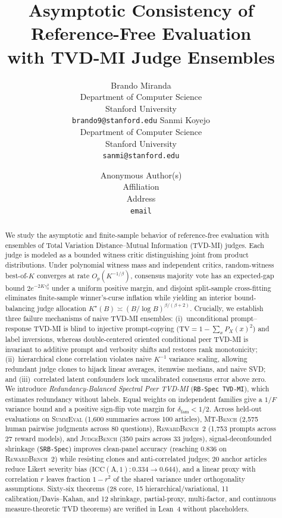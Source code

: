\documentclass{article}
\title{Asymptotic Consistency of Reference-Free Evaluation\\
with TVD-MI Judge Ensembles}
\author{%
  Brando Miranda \\
  Department of Computer Science \\
  Stanford University \\
  \texttt{brando9@stanford.edu}
  \And
  Sanmi Koyejo \\
  Department of Computer Science \\
  Stanford University \\
  \texttt{sanmi@stanford.edu}
}
\author{%
  Anonymous Author(s) \\
  Affiliation \\
  Address \\
  \texttt{email}
}
\theoremstyle{plain}
\theoremstyle{definition}
\theoremstyle{remark}
\begin{document}
\maketitle

\begin{abstract}
We study the asymptotic and finite-sample behavior of reference-free evaluation
with ensembles of Total Variation Distance--Mutual Information (TVD-MI) judges.
Each judge is modeled as a bounded witness critic distinguishing joint from
product distributions. Under polynomial witness mass and independent critics, random-witness best-of-$K$
converges at rate $O_p(K^{-1/\beta})$, consensus majority vote has
an expected-gap bound $2e^{-2K\gamma_0^2}$ under a uniform positive margin, and disjoint split-sample cross-fitting eliminates
finite-sample winner's-curse inflation while yielding an interior
bound-balancing judge allocation $K^\star(B) \asymp (B/\log B)^{\beta/(\beta+2)}$.
Crucially, we establish three failure mechanisms of naive TVD-MI ensembles:
(i)~unconditional prompt--response TVD-MI is blind to injective prompt-copying
($\mathrm{TV} = 1 - \sum_x P_X(x)^2$) and label inversions, whereas
double-centered oriented conditional peer TVD-MI is invariant to additive
prompt and verbosity shifts and restores rank monotonicity; (ii)~hierarchical
clone correlation violates naive $K^{-1}$ variance scaling, allowing redundant
judge clones to hijack linear averages, itemwise medians, and naive SVD; and
(iii)~correlated latent confounders lock uncalibrated consensus error above zero.
We introduce \emph{Redundancy-Balanced Spectral Peer TVD-MI} (\texttt{RB-Spec TVD-MI}),
which estimates redundancy without labels. Equal weights on independent families give
a $1/F$ variance bound and a positive sign-flip vote margin for
$\delta_{\mathrm{fam}} < 1/2$. Across held-out evaluations on \textsc{SummEval}
(1,600 summaries across 100 articles), \textsc{MT-Bench} (2,575 human
pairwise judgments across 80 questions), \textsc{RewardBench~2} (1,753
prompts across 27 reward models), and \textsc{JudgeBench} (350 pairs across
33 judges), signal-deconfounded shrinkage (\texttt{SRB-Spec}) improves clean-panel accuracy (reaching 0.836 on \textsc{RewardBench~2}) while resisting clones and
anti-correlated judges; 20 anchor articles reduce Likert severity bias
($\mathrm{ICC(A,1)}: 0.334 \to 0.644$), and a linear proxy with correlation $r$ leaves fraction $1-r^2$ of the shared variance under orthogonality assumptions.
Sixty-six theorems (28 core, 15 hierarchical/variational, 11 calibration/Davis--Kahan,
and 12 shrinkage, partial-proxy, multi-factor, and continuous measure-theoretic TVD
theorems) are verified in Lean~4 without placeholders.
\end{abstract}
\end{document}
